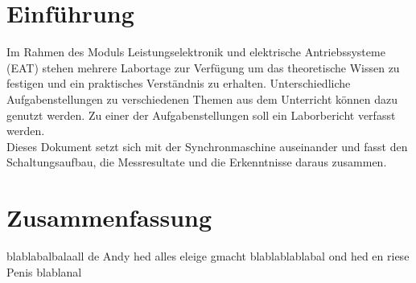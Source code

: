 

\section*{Einführung}

Im Rahmen des Moduls Leistungselektronik und elektrische Antriebssysteme (EAT) stehen mehrere Labortage zur Verfügung um das theoretische Wissen zu festigen und ein praktisches Verständnis zu erhalten.
Unterschiedliche Aufgabenstellungen zu verschiedenen Themen aus dem Unterricht können dazu genutzt werden.
Zu einer der Aufgabenstellungen soll ein Laborbericht verfasst werden.\\

Dieses Dokument setzt sich mit der Synchronmaschine auseinander und fasst den Schaltungsaufbau, die Messresultate und die Erkenntnisse daraus zusammen.\\




\section*{Zusammenfassung}

blablabalbalaall de Andy hed alles eleige gmacht blablablablabal ond hed en riese Penis blablanal
